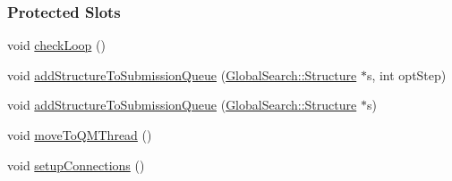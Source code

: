 \subsubsection*{Protected Slots}
\begin{DoxyCompactItemize}
\item 
void \hyperlink{classGlobalSearch_1_1QueueManager_a14256e9fd1827889506d8a767c19d55a}{check\+Loop} ()
\item 
void \hyperlink{classGlobalSearch_1_1QueueManager_a01a7a54687dfcf9929e274a0e451e52a}{add\+Structure\+To\+Submission\+Queue} (\hyperlink{classGlobalSearch_1_1Structure}{Global\+Search\+::\+Structure} $\ast$s, int opt\+Step)
\item 
void \hyperlink{classGlobalSearch_1_1QueueManager_a1eb84caa0ddac997149487cffb30074a}{add\+Structure\+To\+Submission\+Queue} (\hyperlink{classGlobalSearch_1_1Structure}{Global\+Search\+::\+Structure} $\ast$s)
\item 
void \hyperlink{classGlobalSearch_1_1QueueManager_a34f54a19ab868ce38fea4d27c27d60d8}{move\+To\+Q\+M\+Thread} ()
\item 
void \hyperlink{classGlobalSearch_1_1QueueManager_a3c2e07f49b09be24271551d85b7f312f}{setup\+Connections} ()
\end{DoxyCompactItemize}
